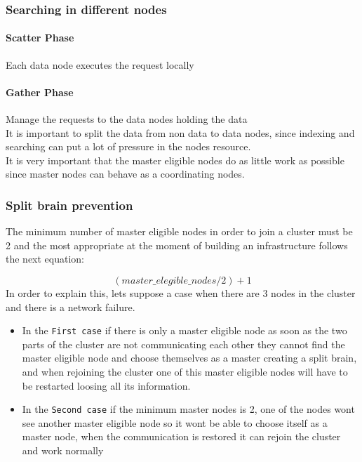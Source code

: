 \subsubsection{Searching in different nodes}
\paragraph{Scatter Phase} Each data node executes the request locally
\paragraph{Gather Phase} Manage the requests to the data nodes holding the data\\

It is important to split the data from non data to data nodes, since indexing and searching can put a lot of pressure in the nodes resource. 
\\

It is very important that the master eligible nodes do as little work as possible since master nodes can behave as a coordinating nodes.

\subsubsection{Split brain prevention}
The minimum number of master eligible nodes in order to join a cluster must be 2 and the most appropriate at the moment of building an infrastructure follows the next equation:

\begin{equation}
(master\_elegible\_nodes / 2)+1
\end{equation}
In order to explain this, lets suppose a case when there are 3 nodes in the cluster and there is a network failure.
\begin{itemize}
\item In the \texttt{First case} if there is only a master eligible node as soon as the two parts of the cluster are not communicating each other they cannot find the master eligible node and choose themselves as a master creating a split brain, and when rejoining the cluster one of this master eligible nodes will have to be restarted loosing all its information.
\item In the \texttt{Second case} if the minimum master nodes is 2, one of the nodes wont see another master eligible node so it wont be able to choose itself as a master node, when the communication is restored it can rejoin the cluster and work normally 
\end{itemize}

